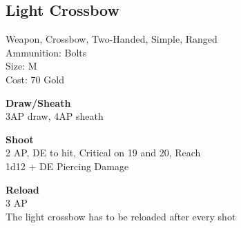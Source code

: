 \subsection{Light Crossbow}\label{weapon:lightCrossbow}
Weapon, Crossbow, Two-Handed, Simple, Ranged\\
Ammunition: Bolts\\
Size: M\\
Cost: 70 Gold

\textbf{Draw/Sheath} \\
3AP draw, 4AP sheath

\textbf{Shoot} \\
2 AP, DE to hit, Critical on 19 and 20,  Reach\\
1d12 + \texttimes DE Piercing Damage

\textbf{Reload} \\
3 AP\\
The light crossbow has to be reloaded after every shot

